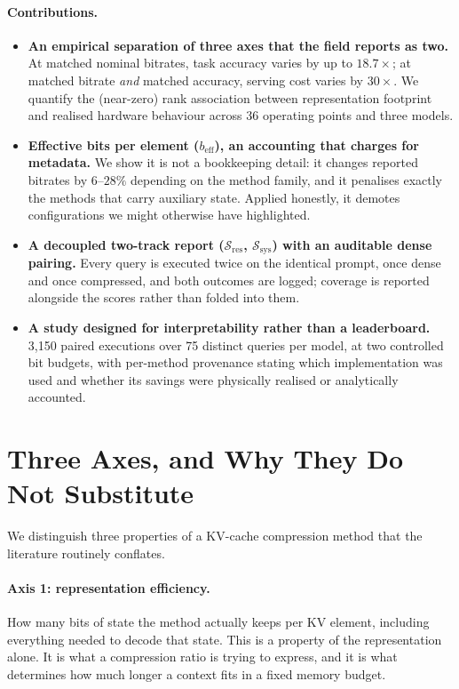 \documentclass{article}
\theoremstyle{definition}
\newcommand{\Sres}{\mathcal{S}_{\text{res}}}
\newcommand{\Ssys}{\mathcal{S}_{\text{sys}}}
\newcommand{\beff}{b_{\text{eff}}}
\begin{document}
\paragraph{Contributions.}
\begin{itemize}[leftmargin=*,itemsep=2.0pt,topsep=3pt]
    \item \textbf{An empirical separation of three axes that the field reports as two.} At matched nominal bitrates, task accuracy varies by up to $18.7\times$; at matched bitrate \emph{and} matched accuracy, serving cost varies by $30\times$. We quantify the (near-zero) rank association between representation footprint and realised hardware behaviour across 36 operating points and three models.
    \item \textbf{Effective bits per element ($\beff$), an accounting that charges for metadata.} We show it is not a bookkeeping detail: it changes reported bitrates by $6$--$28\%$ depending on the method family, and it penalises exactly the methods that carry auxiliary state. Applied honestly, it demotes configurations we might otherwise have highlighted.
    \item \textbf{A decoupled two-track report ($\Sres$, $\Ssys$) with an auditable dense pairing.} Every query is executed twice on the identical prompt, once dense and once compressed, and both outcomes are logged; coverage is reported alongside the scores rather than folded into them.
    \item \textbf{A study designed for interpretability rather than a leaderboard.} 3{,}150 paired executions over 75 distinct queries per model, at two controlled bit budgets, with per-method provenance stating which implementation was used and whether its savings were physically realised or analytically accounted.
\end{itemize}

\section{Three Axes, and Why They Do Not Substitute}
\label{sec:axes}

We distinguish three properties of a KV-cache compression method that the literature routinely conflates.

\paragraph{Axis 1: representation efficiency.} How many bits of state the method actually keeps per KV element, including everything needed to decode that state. This is a property of the representation alone. It is what a compression ratio is trying to express, and it is what determines how much longer a context fits in a fixed memory budget.
\end{document}
